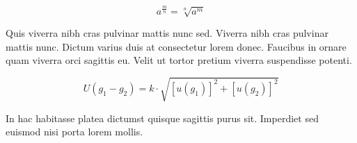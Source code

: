 \documentclass{article}
\begin{document}
    \begin{displaymath}
    	a^{\frac{m}{n}}=\sqrt[n]{a^{m}}
    \end{displaymath}
    
    Quis viverra nibh cras pulvinar mattis nunc sed. Viverra nibh cras pulvinar mattis nunc. Dictum varius duis at consectetur lorem donec. Faucibus in ornare quam viverra orci sagittis eu. Velit ut tortor pretium viverra suspendisse potenti.
    
    
    
    \begin{equation}
    U(g_1-g_2)=k\cdot \sqrt{[u(g_1)]^2+[u(g_2)]^2}
    \end{equation}
    
    In hac habitasse platea dictumst quisque sagittis purus sit. Imperdiet sed euismod nisi porta lorem mollis. 
    
\end{document}
